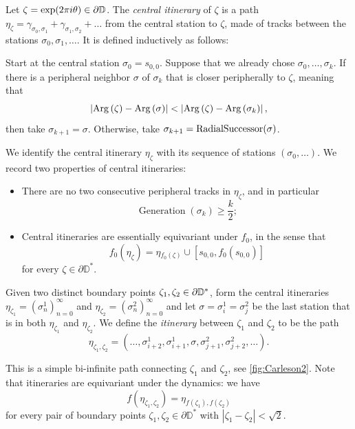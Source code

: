\begin{definition}
Let $\zeta=\exp(2\pi i\theta)\in\partial\mathbb{D}$. 
The \emph{central itinerary} of $\zeta$ is a path 
$\eta_\zeta = \gamma _{\sigma_0,\sigma_1} + \gamma_{\sigma_1,\sigma_2}+\ldots$ 
from the central station to $\zeta$, made of tracks between the stations 
$\sigma_0,\sigma_1,\ldots$. It is defined inductively as follows:

Start at the central station $\sigma_0=s_{0,0}$. Suppose that we already chose $\sigma_0,\ldots,\sigma_k$. If there is a peripheral neighbor $\sigma$ of $\sigma_k$ that is closer peripherally to $\zeta$, meaning that
$$
\left|\operatorname{Arg}\left(\zeta\right)-\operatorname{Arg}\left(\sigma\right)\right|
< \left|\operatorname{Arg}\left(\zeta\right)-\operatorname{Arg}\left(\sigma_{k}\right)\right|,
$$
then take $\sigma_{k+1}=\sigma$. Otherwise, take $\sigma_{k+1}=\operatorname{RadialSuccessor}(\sigma)$.
\end{definition}



We identify the central itinerary $\eta_{\zeta}$ with its sequence of stations $(\sigma_0,\ldots)$. We record two properties of central itineraries:

\begin{itemize}
	\item There are no two consecutive peripheral tracks in $\eta_{\zeta}$, and in particular
	\begin{equation}
	\label{generation-lower-bound}
		\operatorname{Generation}(\sigma_k)\geq \frac k2;
	\end{equation}
	
	\item Central itineraries are essentially equivariant under $f_{0}$, in the sense that
	\begin{equation*}
		f_{0}(\eta_{\zeta})=\eta{}_{f_{0}(\zeta)}\cup[s_{0,0},f_0(s_{0,0})]
	\end{equation*}
	for every $\zeta\in \partial \mathbb D^*$.
\end{itemize}

\begin{definition}
\label{def-disk-itinerary}
Given two distinct boundary points $\zeta_{1},\zeta_{2}\in\partial\mathbb{D}^*$, form the central itineraries $\eta_{\zeta_{1}}=\left(\sigma_{n}^{1}\right)_{n=0}^{\infty}$ and $\eta_{\zeta_{2}}=\left(\sigma_{n}^{2}\right)_{n=0}^{\infty}$ and let  $\sigma=\sigma^1_i=\sigma^2_j$ be the last station that is in both $\eta_{\zeta_{1}}$ and $\eta_{\zeta_{2}}$.  
	 We define the \emph{itinerary} between  $\zeta_{1}$ and $\zeta_{2}$ to be the path 
$$
 \eta_{\zeta_{1},\zeta_{2}}=  \left(\dots,\sigma_{i+2}^{1},\sigma_{i+1}^{1},\sigma,\sigma_{j+1}^{2},\sigma_{j+2}^{2},\dots\right).
$$

	This is a simple bi-infinite path connecting $\zeta_{1}$ and $\zeta_{2}$, see \cref{fig:Carleson2}. Note that itineraries are equivariant under the dynamics: we have  \begin{equation}
		f(\eta_{\zeta_1,\zeta_2})=\eta_{f(\zeta_1),f(\zeta_2)}
	\end{equation} for every pair of boundary points $\zeta_1,\zeta_2 \in \partial \mathbb D^*$ with $|\zeta_1-\zeta_2| < \sqrt{2}$.
\end{definition}



